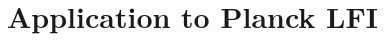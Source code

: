 \documentclass{aa}
\begin{document}






\section{Application to Planck LFI}
\label{sec:lfi}
\end{document}
